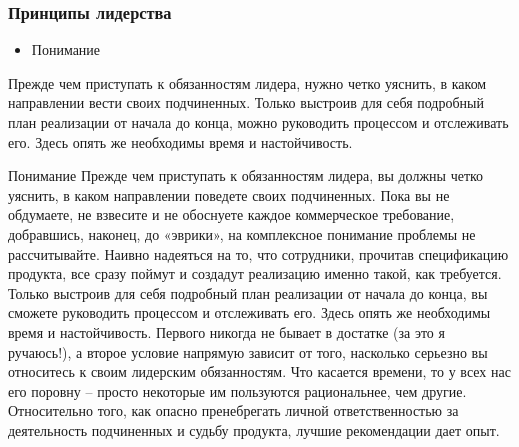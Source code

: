 \documentclass{../industrial-development}
\begin{document}
\begin{frame} \frametitle{Принципы лидерства}
 \begin{block}{}
\begin{itemize}
  \item Понимание
  \end{itemize}
 \end{block}
Прежде чем приступать к обязанностям лидера, нужно четко уяснить, в каком направлении вести своих подчиненных. 
Только выстроив для себя подробный план реализации от начала до конца, можно руководить процессом и отслеживать его. Здесь опять же необходимы время и настойчивость.
\end{frame}
\lecturenotes
Понимание
Прежде чем приступать к обязанностям лидера, вы должны четко уяснить, в каком направлении поведете своих подчиненных. 
Пока вы не обдумаете, не взвесите и не обоснуете каждое коммерческое требование, добравшись, наконец, до «эврики», на комплексное понимание проблемы не рассчитывайте. Наивно надеяться на то, что сотрудники, прочитав спецификацию продукта, все сразу поймут и создадут реализацию именно такой, как требуется. Только выстроив для себя подробный план реализации от начала до конца, вы сможете руководить процессом и отслеживать его. Здесь опять же необходимы время и настойчивость. Первого никогда не бывает в достатке (за это я ручаюсь!), а второе условие напрямую зависит от того, насколько серьезно вы относитесь к своим лидерским обязанностям. Что касается времени, то у всех нас его поровну – просто некоторые им пользуются рациональнее, чем другие. Относительно того, как опасно пренебрегать личной ответственностью за деятельность подчиненных и судьбу продукта, лучшие рекомендации дает опыт.


~\cite{How_to_be_a_good_IT-manager}
\end{document}
